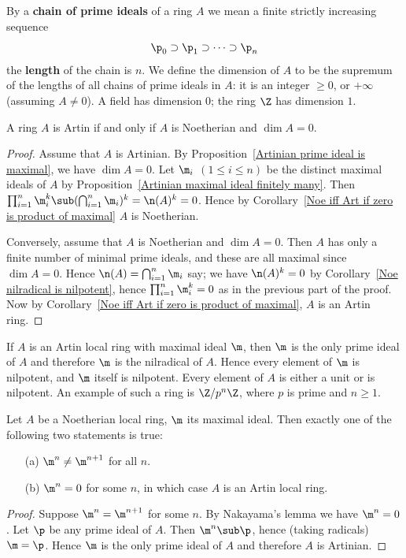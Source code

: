 By a \textbf{chain of prime ideals} of a ring $A$ we mean a finite strictly increasing
sequence 
\[\p_0\supset \p_1\supset\cdots\supset \p_n\]
the \textbf{length} of the chain is $n$. We define the dimension of $A$ to be the supremum of the lengths of all chains of prime ideals in $A$: it is an integer $\geq0$, or $+\infty$ (assuming $A\neq 0$). A field has dimension $0$; the ring $\Z$ has dimension $1$.
\begin{theorem}\label{Artinian iff Noe+dim=0}
A ring $A$ is Artin if and only if $A$ is Noetherian and $\dim A=0$.
\end{theorem}
\begin{proof}
Assume that $A$ is Artinian. By Proposition~\ref{Artinian prime ideal is maximal}, we have $\dim A=0$. Let $\m_i$ $(1\leq i\leq n)$ be the distinct maximal ideals of $A$ by Proposition~\ref{Artinian maximal ideal finitely many}. Then $\prod_{i=1}^{n}\m_i^k\sub(\bigcap_{i=1}^n\m_i)^k=\n(A)^k=0$. Hence by Corollary~\ref{Noe iff Art if zero is product of maximal} $A$ is Noetherian.\par
Conversely, assume that $A$ is Noetherian and $\dim A=0$. Then $A$ has only a finite number of minimal prime ideals, and these are all maximal since $\dim A=0$. Hence $\n(A)=\bigcap_{i=1}^n\m_i$ say; we have $\n(A)^k=0$ by Corollary~\ref{Noe nilradical is nilpotent}, hence $\prod_{i=1}^{n}\m_i^k=0$ as in the previous part of the proof. Now by Corollary~\ref{Noe iff Art if zero is product of maximal}, $A$ is an Artin ring.
\end{proof}
If $A$ is an Artin local ring with maximal ideal $\m$, then $\m$ is the only prime ideal of $A$ and therefore $\m$ is the nilradical of $A$. Hence every element of $\m$ is nilpotent, and $\m$ itself is nilpotent. Every element of $A$ is either a unit or is nilpotent. An example of such a ring is $\Z/p^n\Z$, where $p$ is prime and $n\geq1$.
\begin{proposition}\label{Noe local is Artin iff power of maximal ideal}
Let $A$ be a Noetherian local ring, $\m$ its maximal ideal. Then exactly one of the following two statements is true:
\begin{itemize}
\item[(a)] $\m^n\neq\m^{n+1}$ for all $n$.
\item[(b)] $\m^n=0$ for some $n$, in which case $A$ is an Artin local ring.
\end{itemize}
\end{proposition}
\begin{proof}
Suppose $\m^n=\m^{n+1}$ for some $n$. By Nakayama's lemma we have $\m^n=0$. Let $\p$ be any prime ideal of $A$. Then $\m^n\sub\p$, hence (taking radicals) $\m=\p$. Hence $\m$ is the only prime ideal of $A$ and therefore $A$ is Artinian.
\end{proof}
